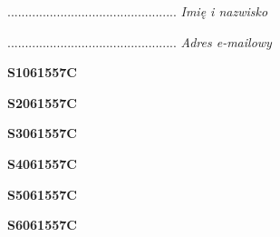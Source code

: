 \begin{turn}{90}\begin{minipage}{\linewidth} \vspace{20mm} ................................................  \textit{Imię i nazwisko}\end{minipage}\end{turn}

\begin{turn}{90}\begin{minipage}{\linewidth} \vspace{20mm} ................................................  \textit{Adres e-mailowy}\end{minipage}\end{turn}

\begin{turn}{90}\huge \begin{minipage}{\linewidth} \vspace{10mm}\textbf{S1061557C}\end{minipage}\end{turn}

\begin{turn}{90}\huge \begin{minipage}{\linewidth} \vspace{10mm}\textbf{S2061557C}\end{minipage}\end{turn}

\begin{turn}{90}\huge \begin{minipage}{\linewidth} \vspace{10mm}\textbf{S3061557C}\end{minipage}\end{turn}

\begin{turn}{90}\huge \begin{minipage}{\linewidth} \vspace{10mm}\textbf{S4061557C}\end{minipage}\end{turn}

\begin{turn}{90}\huge \begin{minipage}{\linewidth} \vspace{10mm}\textbf{S5061557C}\end{minipage}\end{turn}

\begin{turn}{90}\huge \begin{minipage}{\linewidth} \vspace{10mm}\textbf{S6061557C}\end{minipage}\end{turn}

